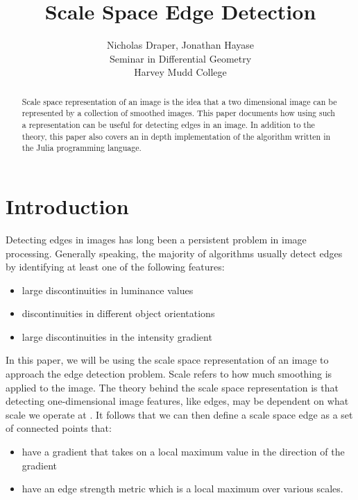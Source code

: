 \documentclass{article}
\title{Scale Space Edge Detection}
\author{
  Nicholas Draper, Jonathan Hayase\\
  Seminar in Differential Geometry\\
  Harvey Mudd College
}
\begin{document}
\maketitle

\begin{abstract}
  Scale space representation of an image is the idea that a two dimensional image can be represented by a collection of smoothed images.
  This paper documents how using such a representation can be useful for detecting edges in an image.
  In addition to the theory, this paper also covers an in depth implementation of the algorithm written in the Julia programming language.
\end{abstract}

\section{Introduction}
Detecting edges in images has long been a persistent problem in image processing.  
Generally speaking, the majority of algorithms usually detect edges by identifying at least one of the following features:
\begin{itemize}
\item large discontinuities in luminance values
\item discontinuities in different object orientations
\item large discontinuities in the intensity gradient
\end{itemize}
In this paper, we will be using the scale space representation of an image to approach the edge detection problem.
Scale refers to how much smoothing is applied to the image. 
The theory behind the scale space representation is that detecting one-dimensional image features, like edges, may be dependent on what scale we operate at \cite{Lindeberg1998}. 
It follows that we can then define a scale space edge as a set of connected points that:
\begin{itemize}
\item have a gradient that takes on a local maximum value in the direction of the gradient\cite{Lindeberg1998}
\item have an edge strength metric which is a local maximum over various scales\cite{Lindeberg1998}.
\end{itemize}
\end{document}
